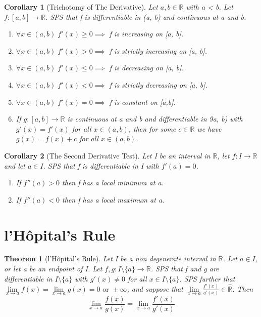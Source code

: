 \documentclass[11pt, oneside]{book}
\theoremstyle{break}
\newtheorem{thm}{Theorem}[section]
\newtheorem{crly}{Corollary}[thm]
\newcommand{\bb}[1]{\mathbb{#1}}		%
\begin{document}
\begin{crly}[Trichotomy of The Derivative]
	Let $a, b \in \bb{R}$ with a < b. Let $f: [a, b] \to \bb{R}$. SPS that f is differentiable in (a, b) and continuous at a and b.
	\begin{enumerate}
		\item $\forall x \in (a, b) \; f'(x) \geq 0 \implies $ f is increasing on [a, b].
		\item $\forall x \in (a, b) \; f'(x) > 0 \implies $ f is strictly increasing on [a, b].
		\item $\forall x \in (a, b) \; f'(x) \leq 0 \implies $ f is decreasing on [a, b].
		\item $\forall x \in (a, b) \; f'(x) < 0 \implies $ f is strictly decreasing on [a, b].
		\item $\forall x \in (a, b) \; f'(x) = 0 \implies $ f is constant on [a,b].
		\item If $g: [a ,b] \to \bb{R}$ is continuous at a and b and differentiable in 9a, b) with $g'(x) = f'(x)$ for all $x \in (a, b)$, then for some $c \in \bb{R}$ we have $g(x) = f(x) + c$ for all $x \in (a, b)$.
	\end{enumerate}
\end{crly}

\begin{crly}[The Second Derivative Test]
	Let I be an interval in $\bb{R}$, let $f: I \to \bb{R}$ and let $a \in I$. SPS that f is differentiable in I with $f'(a) = 0$.
	\begin{enumerate}
		\item If $f''(a) > 0$ then f has a local minimum at a.
		\item If $f''(a) < 0$ then f has a local maximum at a.
	\end{enumerate}
\end{crly}


\section{l'Hôpital's Rule}

\begin{thm}[l'Hôpital's Rule]
	Let I be a non degenerate interval in $\bb{R}$. Let $a \in I$, or let a be an endpoint of I. Let $f, g: I \setminus \{a\} \to \bb{R}$. SPS that f and g are differentiable in $I \setminus \{a\}$ with $g'(x) \neq 0$ for all $x \in I \setminus \{a\}$. SPS further that $\lim\limits_{x \to a} f(x) = \lim\limits_{x \to a} g(x) = 0 \text{ or } \pm \infty$, and suppose that $\lim\limits_{x \to a} \frac{f'(x)}{g'(x)} \in \hat{\bb{R}}$. Then
	\[
		\lim_{x \to a} \frac{f(x)}{g(x)} = \lim_{x \to a} \frac{f'(x)}{g'(x)}
	\]
\end{thm}
\end{document}

